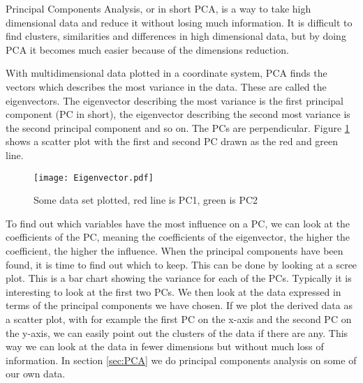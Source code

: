 \documentclass[Report.tex]{subfiles}
\begin{document}
Principal Components Analysis, or in short PCA, is a way to take high dimensional data and reduce it without losing much information. It is difficult to find clusters, similarities and differences in high dimensional data, but by doing PCA it becomes much easier because of the dimensions reduction. \cite{PCAtheory}

With multidimensional data plotted in a coordinate system, PCA finds the vectors which describes the most variance in the data. These are called the eigenvectors. The eigenvector describing the most variance is the first principal component (PC in short), the eigenvector describing the second most variance is the second principal component and so on. The PCs are perpendicular. Figure \ref{fig:eigen} shows a scatter plot with the first and second PC drawn as the red and green line.
\begin{figure}
\center
\texttt{[image: Eigenvector.pdf]}
\caption{Some data set plotted, red line is PC1, green is PC2}
\label{fig:eigen}
\end{figure}

To find out which variables have the most influence on a PC, we can look at the coefficients of the PC, meaning the coefficients of the eigenvector, the higher the coefficient, the higher the influence. 
When the principal components have been found, it is time to find out which to keep. This can be done by looking at a scree plot. This is a bar chart showing the variance for each of the PCs. Typically it is interesting to look at the first two PCs. We then look at the data expressed in terms of the principal components we have chosen. If we plot the derived data as a scatter plot, with for example the first PC on the x-axis and the second PC on the y-axis, we can easily point out the clusters of the data if there are any. This way we can look at the data in fewer dimensions but without much loss of information. In section \ref{sec:PCA} we do principal components analysis on some of our own data.
\end{document}
